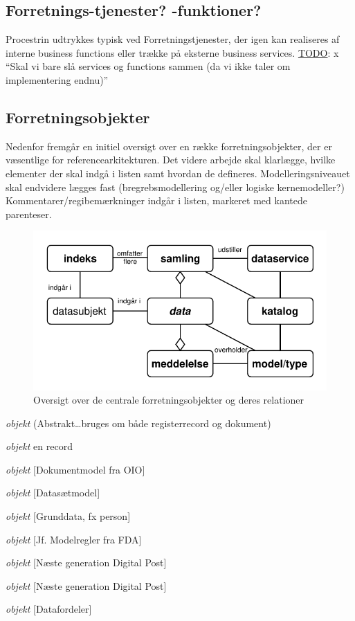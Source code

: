 \subsection{Forretnings-tjenester?
-funktioner?}\label{forretnings-tjenester--funktioner}

Procestrin udtrykkes typisk ved Forretningstjenester, der igen kan
realiseres af interne business functions eller trække på eksterne
business services. \href{x}{TODO}: x ``Skal vi bare slå services og
functions sammen (da vi ikke taler om implementering endnu)''

\subsection{Forretningsobjekter}\label{forretningsobjekter}

Nedenfor fremgår en initiel oversigt over en række forretningsobjekter,
der er væsentlige for referencearkitekturen. Det videre arbejde skal
klarlægge, hvilke elementer der skal indgå i listen samt hvordan de
defineres. Modelleringsniveauet skal endvidere lægges fast
(bregrebsmodellering og/eller logiske kernemodeller?)
Kommentarer/regibemærkninger indgår i listen, markeret med kantede
parenteser.

\begin{figure}
\centering
\includegraphics{objekter.pdf}
\caption{Oversigt over de centrale forretningsobjekter og deres
relationer}
\end{figure}

\begin{description}
\tightlist
\item[Data]
\emph{objekt} (Abstrakt\ldots{}bruges om både registerrecord og
dokument)
\item[Registeroplysning]
\emph{objekt} en record
\item[Dokument]
\emph{objekt} {[}Dokumentmodel fra OIO{]}
\item[Datasamling]
\emph{objekt} {[}Datasætmodel{]}
\item[Datasubjekt]
\emph{objekt} {[}Grunddata, fx person{]}
\item[Model/Schema]
\emph{objekt} {[}Jf. Modelregler fra FDA{]}
\item[Meddelelse]
\emph{objekt} {[}Næste generation Digital Post{]}
\item[Påmindelse]
\emph{objekt} {[}Næste generation Digital Post{]}
\item[Registreringshændelse]
\emph{objekt} {[}Datafordeler{]}
\end{description}

